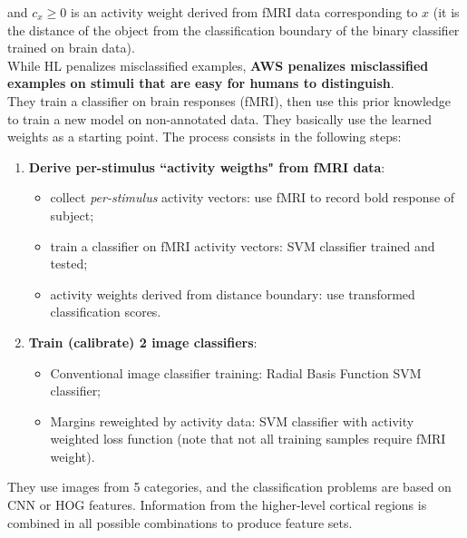 and $c_x \geq 0$ is an activity weight derived from fMRI data corresponding to $x$ (it is the distance of the object from the classification boundary of the binary classifier trained on brain data).\\
While HL penalizes misclassified examples, \textbf{AWS penalizes misclassified examples on stimuli that are easy for humans to distinguish}.\\

They train a classifier on brain responses (fMRI), then use this prior knowledge to train a new model on non-annotated data. They basically use the learned weights as a starting point. The process consists in the following steps:
\begin{enumerate}
    \item \textbf{Derive per-stimulus ``activity weigths" from fMRI data}:
        \begin{itemize}
        \item collect \textit{per-stimulus} activity vectors: use fMRI to record bold response of subject;
        \item train a classifier on fMRI activity vectors: SVM classifier trained and tested;
        \item activity weights derived from distance boundary: use transformed classification scores.
    \end{itemize}
    \item \textbf{Train (calibrate) 2 image classifiers}:
    \begin{itemize}
        \item Conventional image classifier training: Radial Basis Function SVM classifier;
        \item Margins reweighted by activity data: SVM classifier with activity weighted loss function (note that not all training samples require fMRI weight).
    \end{itemize}
\end{enumerate}

They use images from 5 categories, and the classification problems are based on CNN or HOG features. Information from the higher-level cortical regions is combined in all possible combinations to produce feature sets.

